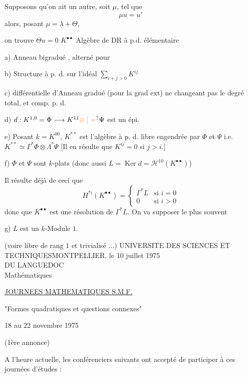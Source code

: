 Supposons qu'on ait un autre, soit $\mu$, tel que
\[
\mu u=u'
\]
alors, posant $\mu=\lambda+\Theta$,

on trouve $\Theta u=0$
$K^{\bullet\bullet}$ Algèbre de DR à p.d. élémentaire

a) Anneau bigradué ,  alterné pour 

b)  Structure à p. d. sur l'idéal $\sum_{i+j>0}K^{ij}$

c) différentielle d'Anneau gradué (pour la grad ext) ne changeant pas le degré total, et comp.  p. d.

d) $d:K^{1,0}=\Phi\longrightarrow K^{11}\unsure{\equiv|=}\Psi$ est un épi.

e) Posant $k=K^{00}$, $K^{**}$ est l'algèbre  à p. d. libre engendrée par $\Phi$ et $\Psi$ i.e. $K^{**}\simeq\Gamma^*\Phi\otimes\Lambda^*\Psi$ [Il en résulte que $K^{ij}=0$ si $j>i$.]

f)  $\Phi$ et $\Psi$ sont $k$-plats (donc aussi $L=\operatorname{Ker}d=\mathscr H^{10}(K^{\bullet\bullet})$)

Il résulte déjà de ceci que
\[
H^{*i}(K^{\bullet\bullet})=
\begin{cases}
\Gamma^*L & \text{si }i=0\\
0 & \text{si }i>0
\end{cases}
\]
donc que $K^{\bullet\bullet}$ est une résolution de $\Gamma^*L$. On va supposer le plus souvent

g) $L$ est un $k$-Module  $1$.

(voire libre de rang $1$ et trivialisé ...)
UNIVERSITE DES SCIENCES ET TECHNIQUES\hfill MONTPELLIER, le 10 juillet 1975\\
DU LANGUEDOC\\
Mathématiques

\uline{JOURNEES MATHEMATIQUES S.M.F.}

"Formes quadratiques et questions connexes"

18 au 22 novembre 1975

(1ère annonce)

A l'heure actuelle, les conférenciers suivants ont accepté de participer à ces journées d'études :

